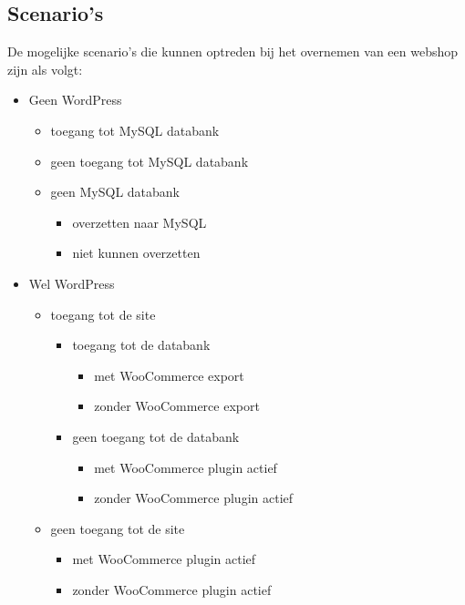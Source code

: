 \subsection{Scenario's}
De mogelijke scenario's die kunnen optreden bij het overnemen van een webshop zijn als volgt:
\begin{itemize}
    \item Geen WordPress
    \begin{itemize}
        \item toegang tot MySQL databank
        \item geen toegang tot MySQL databank
        \item geen MySQL databank
        \begin{itemize}
           \item overzetten naar MySQL
           \item niet kunnen overzetten
       \end{itemize} 
    \end{itemize}
    \item Wel WordPress 
    \begin{itemize}
        \item toegang tot de site
        \begin{itemize}
            \item toegang tot de databank
            \begin{itemize}
                \item met WooCommerce export
                \item zonder WooCommerce export
            \end{itemize} 
            \item geen toegang tot de databank
            \begin{itemize}
                \item met WooCommerce plugin actief
                \item zonder WooCommerce plugin actief
            \end{itemize} 
        \end{itemize} 
        \item geen toegang tot de site
        \begin{itemize}
            \item met WooCommerce plugin actief
            \item zonder WooCommerce plugin actief
        \end{itemize} 
    \end{itemize} 
\end{itemize} 
